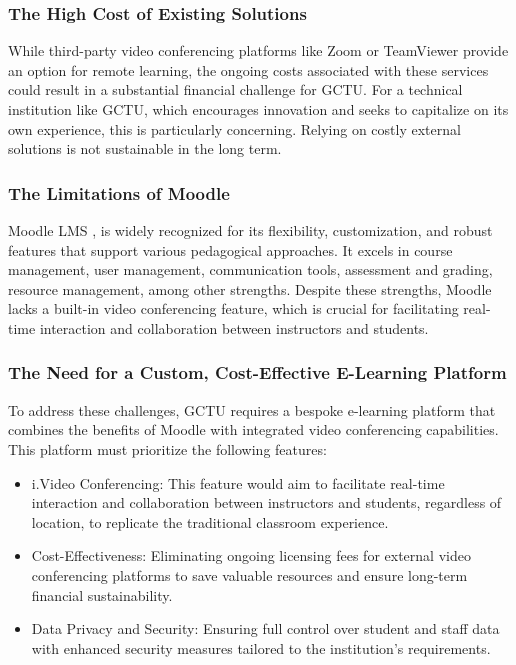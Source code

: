 \documentclass[a4paper,12pt]{article}  %
\begin{document}
\subsubsection{The High Cost of Existing Solutions}
While third-party video conferencing platforms like Zoom or TeamViewer provide
an option for remote learning, the ongoing costs associated with these services
could result in a substantial financial challenge for GCTU. For a technical
institution like GCTU, which encourages innovation and seeks to capitalize on
its own experience, this is particularly concerning. Relying on costly external
solutions is not sustainable in the long term.\\

\subsubsection{The Limitations of Moodle}
Moodle LMS \cite{moodle2024review}, is widely recognized for its flexibility, customization, and robust
features that support various pedagogical approaches. It excels in course
management, user management, communication tools, assessment and grading,
resource management, among other strengths. Despite these strengths, Moodle
lacks a built-in video conferencing feature, which is crucial for facilitating
real-time interaction and collaboration between instructors and students.\\

\subsubsection{The Need for a Custom, Cost-Effective E-Learning Platform}
To address these challenges, GCTU requires a bespoke e-learning platform that
combines the benefits of Moodle with integrated video conferencing
capabilities. This platform must prioritize the following features:\\

\begin{itemize}
  \item i.Video Conferencing: This feature would aim to facilitate real-time
        interaction and collaboration between instructors and students, regardless of
        location, to replicate the traditional classroom experience.\\
  \item Cost-Effectiveness: Eliminating ongoing licensing fees for external video
        conferencing platforms to save valuable resources and ensure long-term
        financial sustainability.\\
  \item Data Privacy and Security: Ensuring full control over student and staff data
        with enhanced security measures tailored to the institution's requirements.\\
\end{itemize}
\end{document}
